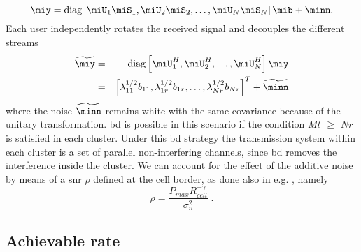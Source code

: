\begin{equation}
	\miy={\rm diag}\left[\miU_1\miS_1, \miU_2\miS_2, \ldots, \miU_N\miS_N \right]\mib+ \minn . \label{eq:4} 
\end{equation}
Each user independently rotates the received signal and decouples the different streams
\begin{eqnarray}
  \widetilde{\miy}&=&{\rm diag}\left[\miU_1^H, \miU_2^H, \ldots, \miU_N^H\right ]\miy\nonumber \\
    &=&\left [
        \lambda_{11}^{1/2}b_{11}, \lambda_{1r}^{1/2}b_{1r}, \ldots, \lambda_{Nr}^{1/2}b_{Nr}
     \right ]^{T}+ \widetilde{\minn}\label{eq:5} 
\end{eqnarray}
where the noise $\widetilde{\minn}$ remains white with the same covariance because of the unitary transformation. \gls{bd} is possible in this scenario if the condition $Mt$ $\geq$ $Nr$ is satisfied in each cluster. Under this \gls{bd} strategy the transmission system within each cluster is a set of parallel non-interfering channels, since \gls{bd} removes the interference inside the cluster. 
We can account for the effect of the additive noise by means of a \gls{snr} $\rho$ defined at the cell border, as done also in e.g. \cite{zhang09}, namely
\begin{equation}
    \rho = \frac{P_{max}R_{cell}^{-\gamma}}{\sigma_n^2}\;. \label{defSNR}
\end{equation}


\subsection{Achievable rate}\label{SINR}

